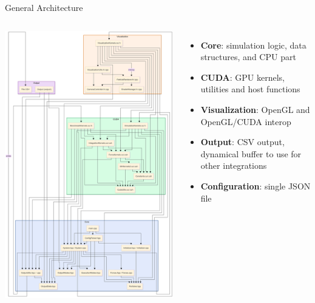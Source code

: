 \documentclass{beamer}
\begin{document}
\begin{frame}{General Architecture}
    \begin{columns}[c]
            \includegraphics[width=\linewidth]{figures/mermaid_chart.png}
            \begin{itemize}
                \item \textbf{Core}: simulation logic, data structures, and CPU part
                \item \textbf{CUDA}: GPU kernels, utilities and host functions
                \item \textbf{Visualization}: OpenGL and OpenGL/CUDA interop
                \item \textbf{Output}: CSV output, dynamical buffer to use for other integrations
                \item \textbf{Configuration}: single JSON file
            \end{itemize}
    \end{columns}
\end{frame}
\end{document}
